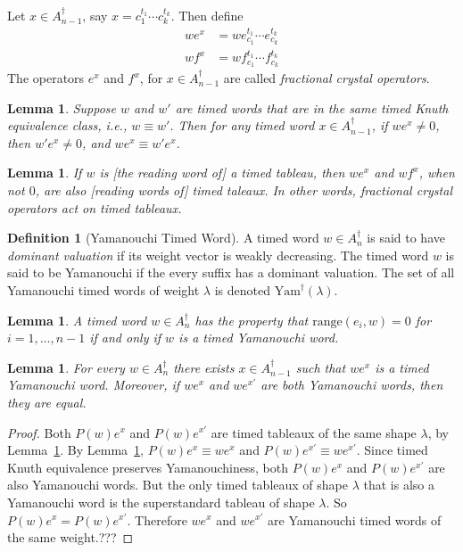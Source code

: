 \documentclass[12pt]{amsproc}
\newcommand{\Yam}{\mathrm{Yam}}
\newcommand{\range}{\mathrm{range}}
\newtheorem{lemma}[theorem]{Lemma}
\theoremstyle{definition}
\newtheorem{definition}[theorem]{Definition}
\begin{document}
Let $x\in A_{n-1}^\dagger$, say $x=c_1^{t_1}\dotsb c_k^{t_k}$.
Then define
\begin{align*}
  we^x & = w e_{c_1}^{t_1}\dotsb e_{c_k}^{t_k}\\
  w f^x & = w f_{c_1}^{t_1}\dotsb f_{c_k}^{t_k}
\end{align*}
The operators $e^x$ and $f^x$, for $x\in A_{n-1}^\dagger$ are called \emph{fractional crystal operators}.
\begin{lemma}
  \label{lemma:crystal-knuth}
  Suppose $w$ and $w'$ are timed words that are in the same timed Knuth equivalence class, i.e., $w\equiv w'$.
  Then for any timed word $x\in A_{n-1}^\dagger$, if $we^x\neq 0$, then $w'e^x\neq 0$, and $we^x\equiv w'e^x$.
\end{lemma}
\begin{lemma}
  \label{lemma:tableau-crystal}
  If $w$ is [the reading word of] a timed tableau, then $we^x$ and $wf^x$, when not $0$, are also [reading words of] timed taleaux.
  In other words, fractional crystal operators act on timed tableaux.
\end{lemma}
\begin{definition}
  [Yamanouchi Timed Word]
  A timed word $w\in A_n^\dagger$ is said to have \emph{dominant valuation} if its weight vector is weakly decreasing.
  The timed word $w$ is said to be Yamanouchi if the every suffix has a dominant valuation.
  The set of all Yamanouchi timed words of weight $\lambda$ is denoted $\Yam^\dagger(\lambda)$.
\end{definition}
\begin{lemma}
  A timed word $w\in A_n^\dagger$ has the property that $\range(e_i,w)=0$ for $i=1,\dotsc,n-1$ if and only if $w$ is a timed Yamanouchi word.
\end{lemma}
\begin{lemma}
  For every $w\in A_n^\dagger$ there exists $x\in A_{n-1}^\dagger$ such that $we^x$ is a timed Yamanouchi word.
  Moreover, if $we^x$ and $we^{x'}$ are both Yamanouchi words, then they are equal.
\end{lemma}
\begin{proof}
  Both $P(w)e^x$ and $P(w)e^{x'}$ are timed tableaux of the same shape $\lambda$, by Lemma~\ref{lemma:tableau-crystal}.
  By Lemma~\ref{lemma:crystal-knuth}, $P(w)e^x\equiv we^x$ and $P(w)e^{x'}\equiv we^{x'}$.
  Since timed Knuth equivalence preserves Yamanouchiness, both $P(w)e^x$ and $P(w)e^{x'}$ are also Yamanouchi words.
  But the only timed tableaux of shape $\lambda$ that is also a Yamanouchi word is the superstandard tableau of shape $\lambda$.
  So $P(w)e^x=P(w)e^{x'}$.
  Therefore $we^x$ and $we^{x'}$ are Yamanouchi timed words of the same weight.???
\end{proof}
\end{document}
